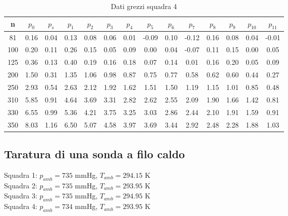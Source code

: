 \begin{table}[H]
    \centering
    \begin{tabular}{|c|c|c|c|c|c|c|c|c|c|c|c|c|c|}
    \hline
    n   & $p_0$ & $p_s$ & $p_1$ & $p_2$ & $p_3$ & $p_4$ & $p_5$ & $p_6$ & $p_7$ & $p_8$ & $p_9$ & $p_{10}$ & $p_{11}$ \\ \hline
    81  & 0.16  & 0.04  & 0.13  & 0.08  & 0.06  & 0.01  & -0.09 & 0.10  & -0.12 & 0.16  & 0.08  & 0.04     & -0.01    \\ \hline
    100 & 0.20  & 0.11  & 0.26  & 0.15  & 0.05  & 0.09  & 0.00  & 0.04  & -0.07 & 0.11  & 0.15  & 0.00     & 0.05     \\ \hline
    125 & 0.36  & 0.13  & 0.40  & 0.19  & 0.16  & 0.18  & 0.07  & 0.14  & 0.01  & 0.16  & 0.20  & 0.05     & 0.09     \\ \hline
    200 & 1.50  & 0.31  & 1.35  & 1.06  & 0.98  & 0.87  & 0.75  & 0.77  & 0.58  & 0.62  & 0.60  & 0.44     & 0.27     \\ \hline
    250 & 2.93  & 0.54  & 2.63  & 2.12  & 1.92  & 1.62  & 1.51  & 1.50  & 1.19  & 1.15  & 1.01  & 0.85     & 0.48     \\ \hline
    310 & 5.85  & 0.91  & 4.64  & 3.69  & 3.31  & 2.82  & 2.62  & 2.55  & 2.09  & 1.90  & 1.66  & 1.42     & 0.81     \\ \hline
    330 & 6.55  & 0.99  & 5.36  & 4.21  & 3.75  & 3.25  & 3.03  & 2.86  & 2.44  & 2.10  & 1.91  & 1.59     & 0.91     \\ \hline
    350 & 8.03  & 1.16  & 6.50  & 5.07  & 4.58  & 3.97  & 3.69  & 3.44  & 2.92  & 2.48  & 2.28  & 1.88     & 1.03     \\ \hline
    \end{tabular}
    \caption{Dati grezzi squadra 4}
\end{table}

\newpage\subsection{Taratura di una sonda a filo caldo}\label{a8}
Squadra 1: $p_{amb}=735$ mmHg, $T_{amb}=294.15$ K\\
Squadra 2: $p_{amb}=735$ mmHg, $T_{amb}=293.95$ K\\
Squadra 3: $p_{amb}=735$ mmHg, $T_{amb}=294.95$ K\\
Squadra 4: $p_{amb}=734$ mmHg, $T_{amb}=293.95$ K

